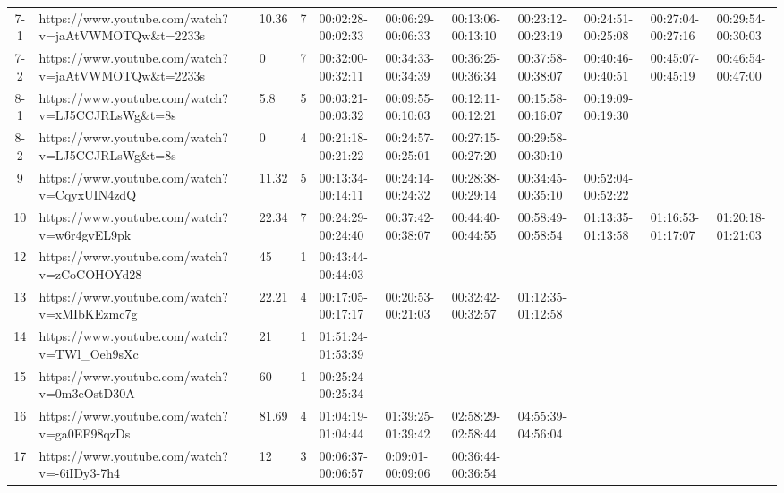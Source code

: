 \begin{landscape}
\begin{table}[!ht]
{\begin{tabular}{|c|p{11cm}|p{1.4cm}|c|p{3.1cm}|p{3.0cm}|p{3.5cm}|p{3.1cm}|p{3.1cm}|p{3.1cm}|p{3.1cm}|}
        \rowcolor{gray!10}
        7-1 & https://www.youtube.com/watch?v=jaAtVWMOTQw\&t=2233s & 10.36 & 7 & 00:02:28-00:02:33 & 00:06:29-00:06:33 & 00:13:06-00:13:10 & 00:23:12-00:23:19 & 00:24:51-00:25:08 & 00:27:04-00:27:16 & 00:29:54-00:30:03  \\ 
        7-2 & https://www.youtube.com/watch?v=jaAtVWMOTQw\&t=2233s & 0 & 7 & 00:32:00-00:32:11 & 00:34:33-00:34:39 & 00:36:25-00:36:34 & 00:37:58-00:38:07 & 00:40:46-00:40:51 & 00:45:07-00:45:19 & 00:46:54-00:47:00  \\ 
        \rowcolor{gray!10}
        8-1 & https://www.youtube.com/watch?v=LJ5CCJRLsWg\&t=8s & 5.8 & 5 & 00:03:21-00:03:32 & 00:09:55-00:10:03 & 00:12:11-00:12:21 & 00:15:58-00:16:07 & 00:19:09-00:19:30 & ~ &   \\ 
        8-2 & https://www.youtube.com/watch?v=LJ5CCJRLsWg\&t=8s & 0 & 4 & 00:21:18-00:21:22 & 00:24:57-00:25:01 & 00:27:15-00:27:20 & 00:29:58-00:30:10 & ~ & ~ &   \\ 
        \rowcolor{gray!10}
        9 & https://www.youtube.com/watch?v=CqyxUIN4zdQ & 11.32 & 5 & 00:13:34-00:14:11 & 00:24:14-00:24:32 & 00:28:38-00:29:14 & 00:34:45-00:35:10 & 00:52:04-00:52:22 & ~ &   \\ 
        10 & https://www.youtube.com/watch?v=w6r4gvEL9pk & 22.34 & 7 & 00:24:29-00:24:40 & 00:37:42-00:38:07 & 00:44:40-00:44:55 & 00:58:49-00:58:54 & 01:13:35-01:13:58 & 01:16:53-01:17:07 & 01:20:18-01:21:03  \\ 
        \rowcolor{gray!10}
        12 & https://www.youtube.com/watch?v=zCoCOHOYd28 & 45 & 1 & 00:43:44-00:44:03 & ~ & ~ & ~ & ~ & ~ &   \\ 
        13 & https://www.youtube.com/watch?v=xMIbKEzmc7g & 22.21 & 4 & 00:17:05-00:17:17 & 00:20:53-00:21:03 & 00:32:42-00:32:57 & 01:12:35-01:12:58 & ~ & ~ &   \\ 
        \rowcolor{gray!10}
        14 & https://www.youtube.com/watch?v=TWl\_Oeh9sXc & 21 & 1 & 01:51:24-01:53:39 & ~ & ~ & ~ & ~ & ~ &   \\ 
        15 & https://www.youtube.com/watch?v=0m3eOstD30A & 60 & 1 & 00:25:24-00:25:34 & ~ & ~ & ~ & ~ & ~ &   \\ 
        \rowcolor{gray!10}
        16 & https://www.youtube.com/watch?v=ga0EF98qzDs & 81.69 & 4 & 01:04:19-01:04:44 & 01:39:25-01:39:42 & 02:58:29-02:58:44 & 04:55:39-04:56:04 & ~ & ~ &   \\ 
        17 & https://www.youtube.com/watch?v=-6iIDy3-7h4 & 12 & 3 & 00:06:37-00:06:57 & 0:09:01-00:09:06 & 00:36:44-00:36:54 & ~ & ~ & ~ &   \\ 

\end{tabular}}
\end{table}
\end{landscape}
